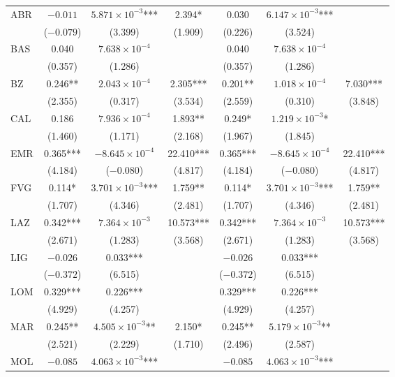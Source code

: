 \documentclass[12pt]{article}
\begin{document}
\begin{appendices}
\begin{longtable}{@{}lcccccc@{}}
            ABR & $-0.011$ & $5.871 \times 10^{-3}$*** & 2.394* & 0.030 & $6.147 \times 10^{-3}$*** &  \\ 
             & ($-0.079$) & (3.399) & (1.909) & (0.226) & (3.524) &  \\ 
            BAS & 0.040 & $7.638 \times 10^{-4}$ &  & 0.040 & $7.638 \times 10^{-4}$ &  \\ 
             & (0.357) & (1.286) &   & (0.357) & (1.286) &  \\ 
            BZ & 0.246** & $2.043 \times 10^{-4}$ & 2.305*** & 0.201** & $1.018 \times 10^{-4}$ & 7.030*** \\ 
             & (2.355) & (0.317) & (3.534) & (2.559) & (0.310) & (3.848) \\ 
            CAL & 0.186 & $7.936 \times 10^{-4}$ & 1.893** & 0.249* & $1.219 \times 10^{-3}$* &  \\ 
             & (1.460) & (1.171) & (2.168) & (1.967) & (1.845) &  \\ 
            EMR & 0.365*** & $-8.645 \times 10^{-4}$ & 22.410*** & 0.365*** & $-8.645 \times 10^{-4}$ & 22.410*** \\ 
             & (4.184) & ($-0.080$) & (4.817) & (4.184) & ($-0.080$) & (4.817) \\ 
            FVG & 0.114* & $3.701 \times 10^{-3}$*** & 1.759** & 0.114* & $3.701 \times 10^{-3}$*** & 1.759** \\ 
             & (1.707) & (4.346) & (2.481) & (1.707) & (4.346) & (2.481) \\ 
            LAZ & 0.342*** & $7.364 \times 10^{-3}$ & 10.573*** & 0.342*** & $7.364 \times 10^{-3}$ & 10.573*** \\ 
             & (2.671) & (1.283) & (3.568) & (2.671) & (1.283) & (3.568) \\ 
            LIG & $-0.026$ & 0.033*** &  & $-0.026$ & 0.033*** &  \\ 
             & ($-0.372$) & (6.515) &  & ($-0.372$) & (6.515) &  \\ 
            LOM & 0.329*** & 0.226*** &  & 0.329*** & 0.226*** &  \\ 
             & (4.929) & (4.257) &  & (4.929) & (4.257) &  \\ 
            MAR & 0.245** & $4.505 \times 10^{-3}$** & 2.150* & 0.245** & $5.179 \times 10^{-3}$** &  \\ 
             & (2.521) & (2.229) & (1.710) & (2.496) & (2.587) &  \\ 
            MOL & $-0.085$ & $4.063 \times 10^{-3}$*** &  & $-0.085$ & $4.063 \times 10^{-3}$*** &  \\ 

\end{longtable}
\end{appendices}
\end{document}
